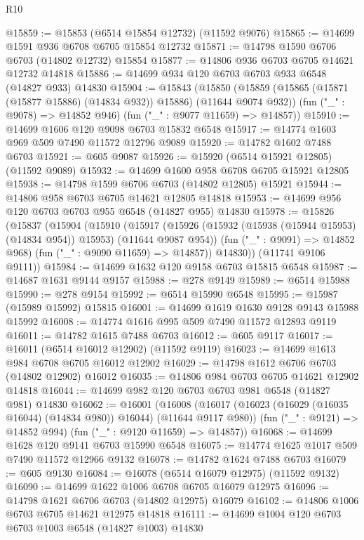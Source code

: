 \begin{lexlean}{R10}
\begin{coremodule}
{{{{{{{{{{{{{{{{{{{{{{{{{{{{{{{{{{{{{{{{{{{{{{{{{{{{{{{{{{{{{{{{{{{{{{{{{{{{{{{{{{{{@15859 := @15853 (@6514 @15854 @12732) (@11592 @9076)
@15865 := @14699 @1591 @936 @6708 @6705 @15854 @12732
@15871 := @14798 @1590 @6706 @6703 (@14802 @12732) @15854
@15877 := @14806 @936 @6703 @6705 @14621 @12732 @14818
@15886 := @14699 @934 @120 @6703 @6703 @933 @6548 (@14827 @933) @14830
@15904 := @15843
    (@15850
      (@15859 (@15865 (@15871 (@15877 @15886) (@14834 @932)) @15886) (@11644 @9074 @932))
      (fun ("_" : @9078) => @14852 @946)
      (fun ("_" : @9077 @11659) => @14857))
@15910 := @14699 @1606 @120 @9098 @6703 @15832 @6548
@15917 := @14774 @1603 @969 @509 @7490 @11572 @12796 @9089
@15920 := @14782 @1602 @7488 @6703
@15921 := @605 @9087
@15926 := @15920 (@6514 @15921 @12805) (@11592 @9089)
@15932 := @14699 @1600 @958 @6708 @6705 @15921 @12805
@15938 := @14798 @1599 @6706 @6703 (@14802 @12805) @15921
@15944 := @14806 @958 @6703 @6705 @14621 @12805 @14818
@15953 := @14699 @956 @120 @6703 @6703 @955 @6548 (@14827 @955) @14830
@15978 := @15826
    (@15837
      (@15904
        (@15910
          (@15917
            (@15926 (@15932 (@15938 (@15944 @15953) (@14834 @954)) @15953) (@11644 @9087 @954))
            (fun ("_" : @9091) => @14852 @968)
            (fun ("_" : @9090 @11659) => @14857))
          @14830))
      (@11741 @9106 @9111))
@15984 := @14699 @1632 @120 @9158 @6703 @15815 @6548
@15987 := @14687 @1631 @9144 @9157
@15988 := @278 @9149
@15989 := @6514 @15988
@15990 := @278 @9154
@15992 := @6514 @15990 @6548
@15995 := @15987 (@15989 @15992) @15815
@16001 := @14699 @1619 @1630 @9128 @9143 @15988 @15992
@16008 := @14774 @1616 @995 @509 @7490 @11572 @12893 @9119
@16011 := @14782 @1615 @7488 @6703
@16012 := @605 @9117
@16017 := @16011 (@6514 @16012 @12902) (@11592 @9119)
@16023 := @14699 @1613 @984 @6708 @6705 @16012 @12902
@16029 := @14798 @1612 @6706 @6703 (@14802 @12902) @16012
@16035 := @14806 @984 @6703 @6705 @14621 @12902 @14818
@16044 := @14699 @982 @120 @6703 @6703 @981 @6548 (@14827 @981) @14830
@16062 := @16001
    (@16008
      (@16017 (@16023 (@16029 (@16035 @16044) (@14834 @980)) @16044) (@11644 @9117 @980))
      (fun ("_" : @9121) => @14852 @994)
      (fun ("_" : @9120 @11659) => @14857))
@16068 := @14699 @1628 @120 @9141 @6703 @15990 @6548
@16075 := @14774 @1625 @1017 @509 @7490 @11572 @12966 @9132
@16078 := @14782 @1624 @7488 @6703
@16079 := @605 @9130
@16084 := @16078 (@6514 @16079 @12975) (@11592 @9132)
@16090 := @14699 @1622 @1006 @6708 @6705 @16079 @12975
@16096 := @14798 @1621 @6706 @6703 (@14802 @12975) @16079
@16102 := @14806 @1006 @6703 @6705 @14621 @12975 @14818
@16111 := @14699 @1004 @120 @6703 @6703 @1003 @6548 (@14827 @1003) @14830
}}}}}}}}}}}}}}}}}}}}}}}}}}}}}}}}}}}}}}}}}}}}}}}}}}}}}}}}}}}}}}}}}}}}}}}}}}}}}}}}}}}}
\end{coremodule}
\end{lexlean}
